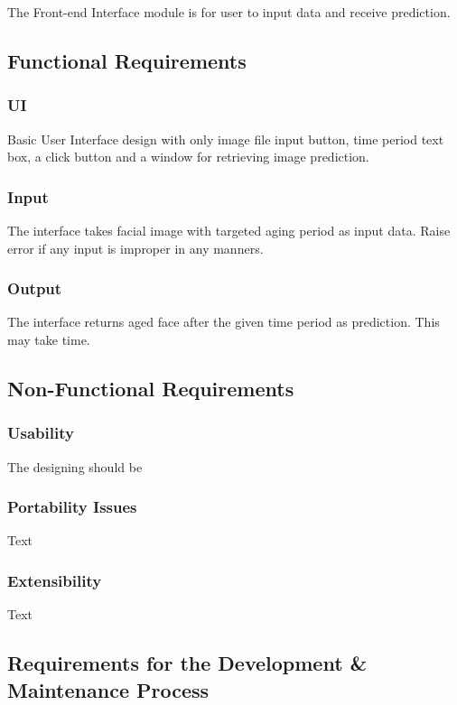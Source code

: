\documentclass[12pt]{article}
\begin{document}
\noindent The Front-end Interface module is for user to input data and receive prediction.

\subsection{Functional Requirements}
\subsubsection{UI}
Basic User Interface design with only image file input button, time period text box, a click button and a window for retrieving image prediction.
\subsubsection{Input}\label{input}
The interface takes facial image with targeted aging period as input data. Raise error if any input is improper in any manners.
\subsubsection{Output}
The interface returns aged face after the given time period as prediction. This may take time.

\subsection{Non-Functional Requirements}

\subsubsection {Usability}

The designing should be

\subsubsection {Portability Issues}

Text

\subsubsection {Extensibility}
 
Text

\subsection{Requirements for the Development \& Maintenance Process}
\end{document}
